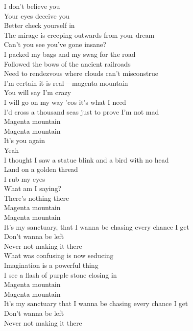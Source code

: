 I don't believe you\\
Your eyes deceive you\\
Better check yourself in\\
The mirage is creeping outwards from your dream\\
Can't you see you've gone insane?\\

I packed my bags and my swag for the road\\
Followed the bows of the ancient railroads\\
Need to rendezvous where clouds can't misconstrue\\
I'm certain it is real -- magenta mountain\\

You will say I'm crazy\\
I will go on my way 'cos it's what I need\\
I'd cross a thousand seas just to prove I'm not mad\\
Magenta mountain\\

Magenta mountain\\

It's you again\\
Yeah\\
I thought I saw a statue blink and a bird with no head\\
Land on a golden thread\\
I rub my eyes\\
What am I saying?\\
There's nothing there\\

Magenta mountain\\
Magenta mountain\\
It's my sanctuary, that I wanna be chasing every chance I get\\
Don't wanna be left\\
Never not making it there\\

What was confusing is now seducing\\
Imagination is a powerful thing\\
I see a flash of purple stone closing in\\

Magenta mountain\\
Magenta mountain\\
It's my sanctuary that I wanna be chasing every chance I get\\
Don't wanna be left\\
Never not making it there\\

